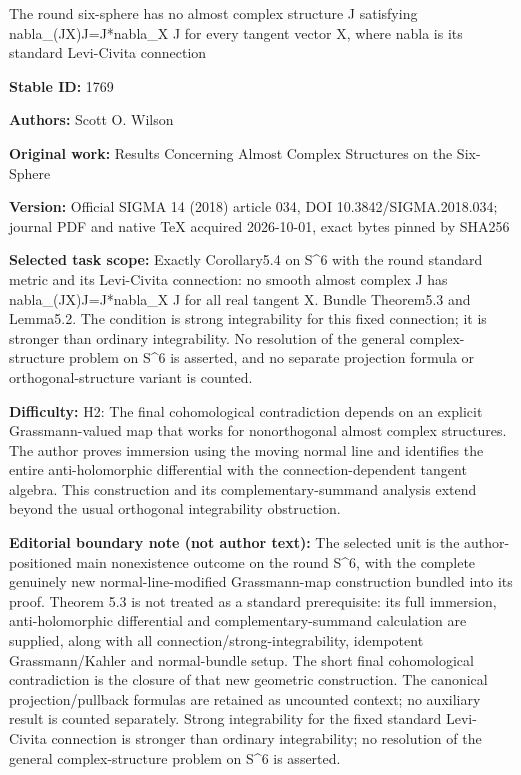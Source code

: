 \documentclass[11pt]{article}
\numberwithin{equation}{section}
\begin{document}
\begin{center}\Large The round six-sphere has no almost complex structure J satisfying nabla\_(JX)J=J*nabla\_X J for every tangent vector X, where nabla is its standard Levi-Civita connection\end{center}
\noindent\textbf{Stable ID:} 1769\par
\noindent\textbf{Authors:} Scott O. Wilson\par
\noindent\textbf{Original work:} Results Concerning Almost Complex Structures on the Six-Sphere\par
\noindent\textbf{Version:} Official SIGMA 14 (2018) article 034, DOI 10.3842/SIGMA.2018.034; journal PDF and native TeX acquired 2026-10-01, exact bytes pinned by SHA256\par
\noindent\textbf{Selected task scope:} Exactly Corollary5.4 on S\textasciicircum{}6 with the round standard metric and its Levi-Civita connection: no smooth almost complex J has nabla\_(JX)J=J*nabla\_X J for all real tangent X. Bundle Theorem5.3 and Lemma5.2. The condition is strong integrability for this fixed connection; it is stronger than ordinary integrability. No resolution of the general complex-structure problem on S\textasciicircum{}6 is asserted, and no separate projection formula or orthogonal-structure variant is counted.\par
\noindent\textbf{Difficulty:} H2: The final cohomological contradiction depends on an explicit Grassmann-valued map that works for nonorthogonal almost complex structures. The author proves immersion using the moving normal line and identifies the entire anti-holomorphic differential with the connection-dependent tangent algebra. This construction and its complementary-summand analysis extend beyond the usual orthogonal integrability obstruction.\par
\noindent\textbf{Editorial boundary note (not author text):} The selected unit is the author-positioned main nonexistence outcome on the round S\textasciicircum{}6, with the complete genuinely new normal-line-modified Grassmann-map construction bundled into its proof. Theorem 5.3 is not treated as a standard prerequisite: its full immersion, anti-holomorphic differential and complementary-summand calculation are supplied, along with all connection/strong-integrability, idempotent Grassmann/Kahler and normal-bundle setup. The short final cohomological contradiction is the closure of that new geometric construction. The canonical projection/pullback formulas are retained as uncounted context; no auxiliary result is counted separately. Strong integrability for the fixed standard Levi-Civita connection is stronger than ordinary integrability; no resolution of the general complex-structure problem on S\textasciicircum{}6 is asserted.\par
\end{document}
